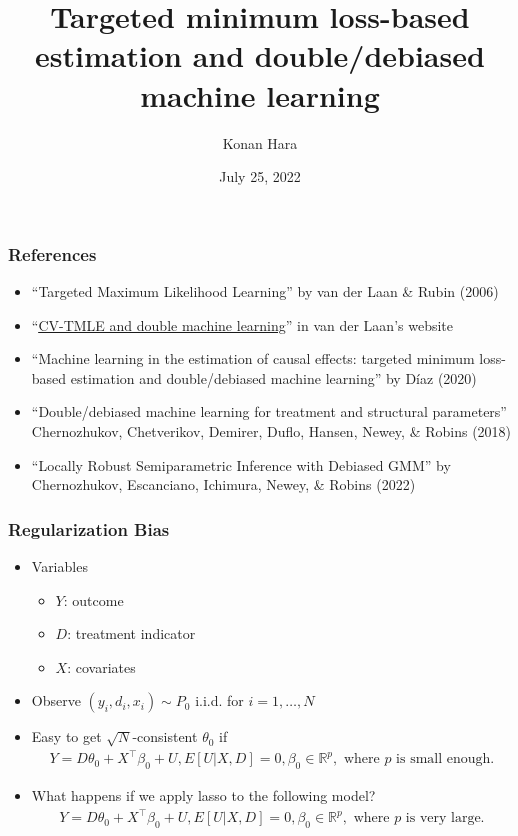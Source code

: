 \documentclass[aspectratio=169, 12pt]{beamer}
\title[TMLE and DML]{Targeted minimum loss-based estimation and double/debiased machine learning}
\author[Konan Hara]{Konan Hara}
\institute[Arizona]{University of Arizona}
\date{July 25, 2022}
\newcommand{\R}{\mathbb{R}}
\begin{document}
	\begin{frame}[plain]
	\titlepage
	\end{frame}

	\begin{frame}
	\frametitle{References}
	\begin{itemize}
	\item ``Targeted Maximum Likelihood Learning'' by van der Laan \& Rubin (2006)
	\item ``\href{https://vanderlaan-lab.org/2019/12/24/cv-tmle-and-double-machine-learning/}{\underline{CV-TMLE and double machine learning}}'' in van der Laan's website
	\item ``Machine learning in the estimation of causal effects: targeted minimum loss-based estimation and double/debiased machine learning'' by D\'iaz (2020)
	\item ``Double/debiased machine learning for treatment and structural parameters'' Chernozhukov, Chetverikov, Demirer, Duflo, Hansen, Newey, \& Robins (2018)
	\item ``Locally Robust Semiparametric Inference with Debiased GMM'' by Chernozhukov, Escanciano, Ichimura, Newey, \& Robins (2022)
	\end{itemize}
	\end{frame}

	\begin{frame}
	\frametitle{Regularization Bias}
	\begin{itemize}
	\item Variables
	\begin{itemize}
	\item $Y$: outcome
	\item $D$: treatment indicator
	\item $X$: covariates
	\end{itemize}
	\item Observe $(y_i,d_i,x_i) \sim P_0 $ i.i.d. for $i=1,\dots,N $
	\item Easy to get $\sqrt{N}$-consistent $\theta_0$ if
	\begin{eqnarray*}
	Y = D\theta_0 + X^\top \beta_0 + U, E[U|X,D]=0, \beta_0 \in \R^p, \text{ where } p \text{ is small enough.}
	\end{eqnarray*}
	\item What happens if we apply lasso to the following model?
	\begin{eqnarray*}
	Y = D\theta_0 + X^\top \beta_0 + U, E[U|X,D]=0, \beta_0 \in \R^p, \text{ where } p \text{ is very large.}
	\end{eqnarray*}
	\end{itemize}
		
	\end{frame}
\end{document}
